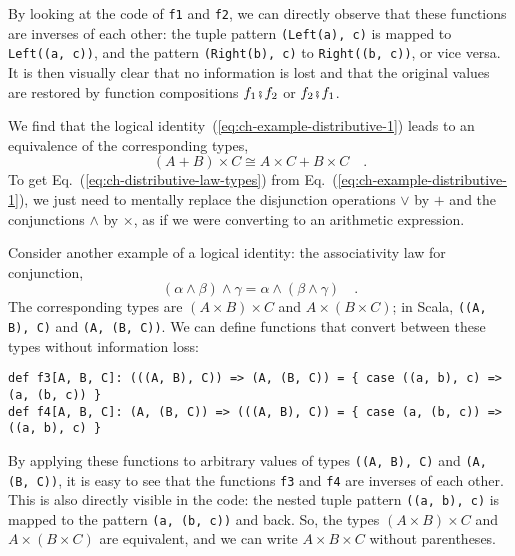 By looking at the code of \lstinline!f1! and \lstinline!f2!, we
can directly observe that these functions are inverses of each other:
the tuple pattern \lstinline!(Left(a), c)! is mapped to \lstinline!Left((a, c))!,
and the pattern \lstinline!(Right(b), c)! to \lstinline!Right((b, c))!,
or vice versa. It is then visually clear that no information is lost
and that the original values are restored by function compositions
$f_{1}\bef f_{2}$ or $f_{2}\bef f_{1}$.

We find that the logical identity~(\ref{eq:ch-example-distributive-1})
leads to an equivalence of the corresponding types,
\begin{equation}
\left(A+B\right)\times C\cong A\times C+B\times C\quad.\label{eq:ch-distributive-law-types}
\end{equation}
To get Eq.~(\ref{eq:ch-distributive-law-types}) from Eq.~(\ref{eq:ch-example-distributive-1}),
we just need to mentally replace the disjunction operations $\vee$
by $+$ and the conjunctions $\wedge$ by $\times$, as if we were
converting to an arithmetic expression.

Consider another example of a logical identity: the associativity
law for conjunction,
\begin{equation}
\left(\alpha\wedge\beta\right)\wedge\gamma=\alpha\wedge\left(\beta\wedge\gamma\right)\quad.\label{eq:ch-example-associativity-conjunction}
\end{equation}
The corresponding types are $(A\times B)\times C$ and $A\times(B\times C)$;
in Scala, \lstinline!((A, B), C)! and \lstinline!(A, (B, C))!. We
can define functions that convert between these types without information
loss:
\begin{lstlisting}
def f3[A, B, C]: (((A, B), C)) => (A, (B, C)) = { case ((a, b), c) => (a, (b, c)) }
def f4[A, B, C]: (A, (B, C)) => (((A, B), C)) = { case (a, (b, c)) => ((a, b), c) }
\end{lstlisting}
By applying these functions to arbitrary values of types \lstinline!((A, B), C)!
and \lstinline!(A, (B, C))!, it is easy to see that the functions
\lstinline!f3! and \lstinline!f4! are inverses of each other. This
is also directly visible in the code: the nested tuple pattern \lstinline!((a, b), c)!
is mapped to the pattern \lstinline!(a, (b, c))! and back. So, the
types $\left(A\times B\right)\times C$ and $A\times\left(B\times C\right)$
are equivalent, and we can write $A\times B\times C$ without parentheses.

